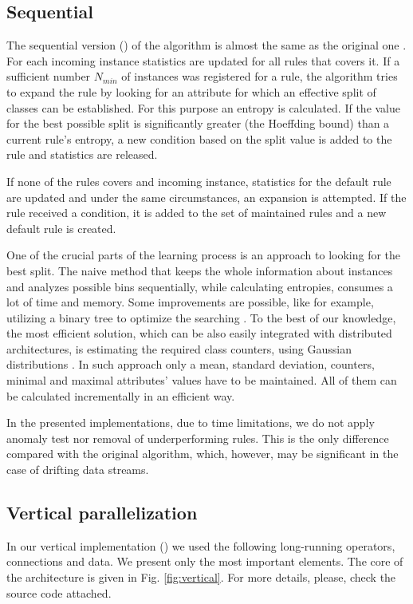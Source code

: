 \documentclass[journal]{IEEEtran}
\newcommand{\textot}[1]{\scalebox{0.95}{\texttt{#1}}}
\begin{document}
\subsection{Sequential}
The sequential version (\textot{SAMR}) of the algorithm is almost the same as the original one \cite{Gama:2011}. For each incoming instance statistics are updated for all rules that covers it. If a sufficient number $N_{min}$ of instances was registered for a rule, the algorithm tries to expand the rule by looking for an attribute for which an effective split of classes can be established. For this purpose an entropy is calculated. If the value for the best possible split is significantly greater (the Hoeffding bound) than a current rule's entropy, a new condition based on the split value is added to the rule and statistics are released.

If none of the rules covers and incoming instance, statistics for the default rule are updated and under the same circumstances, an expansion is attempted. If the rule received a condition, it is added to the set of maintained rules and a new default rule is created.

One of the crucial parts of the learning process is an approach to looking for the best split. The naive method that keeps the whole information about instances and analyzes possible bins sequentially, while calculating entropies, consumes a lot of time and memory. Some improvements are possible, like for example, utilizing a binary tree to optimize the searching \cite{Gama:2003}. To the best of our knowledge, the most efficient solution, which can be also easily integrated with distributed architectures, is estimating the required class counters, using Gaussian distributions \cite{Pfahringer:2008}. In such approach only a mean, standard deviation, counters, minimal and maximal attributes' values have to be maintained. All of them can be calculated incrementally in an efficient way.

In the presented implementations, due to time limitations, we do not apply anomaly test nor removal of underperforming rules. This is the only difference compared with the original algorithm, which, however, may be significant in the case of drifting data streams.

\subsection{Vertical parallelization}

In our vertical implementation (\textot{VAMR}) we used the following long-running operators, connections and data. We present only the most important elements. The core of the architecture is given in Fig. \ref{fig:vertical}. For more details, please, check the source code attached.
\end{document}
